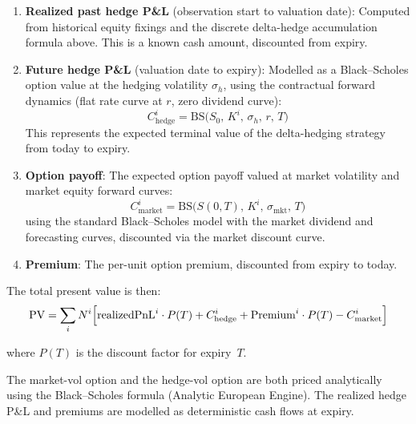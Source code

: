 \begin{enumerate}
\item \textbf{Realized past hedge P\&L} (observation start to valuation date):
  Computed from historical equity fixings and the discrete delta-hedge
  accumulation formula above.  This is a known cash amount, discounted from
  expiry.

\item \textbf{Future hedge P\&L} (valuation date to expiry):  Modelled as a
  Black--Scholes option value at the hedging volatility $\sigma_h$, using the
  contractual forward dynamics (flat rate curve at $r$, zero dividend curve):
  $$
  C_{\text{hedge}}^{i} = \text{BS}\bigl(S_0,\, K^i,\, \sigma_h,\, r,\, T\bigr)
  $$
  This represents the expected terminal value of the delta-hedging strategy
  from today to expiry.

\item \textbf{Option payoff}:  The expected option payoff valued at market
  volatility and market equity forward curves:
  $$
  C_{\text{market}}^{i} = \text{BS}\bigl(S(0,T),\, K^i,\, \sigma_{\text{mkt}},\, T\bigr)
  $$
  using the standard Black--Scholes model with the market dividend and
  forecasting curves, discounted via the market discount curve.

\item \textbf{Premium}:  The per-unit option premium, discounted from expiry
  to today.
\end{enumerate}

The total present value is then:
$$
\text{PV} = \sum_{i} N^{i} \Bigl[
  \text{realizedPnL}^{i} \cdot P(T)
  + C_{\text{hedge}}^{i}
  + \text{Premium}^{i} \cdot P(T)
  - C_{\text{market}}^{i}
\Bigr]
$$

where $P(T)$ is the discount factor for expiry~$T$.

\medskip
The market-vol option and the hedge-vol option are both priced analytically
using the Black--Scholes formula (Analytic European Engine).  The realized
hedge P\&L and premiums are modelled as deterministic cash flows at expiry.
